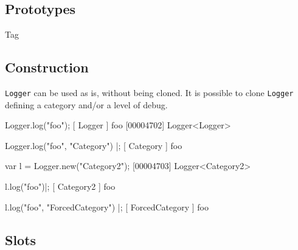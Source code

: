 \subsection{Prototypes}
\begin{refObjects}
\item[Tag]
\end{refObjects}

\subsection{Construction}

\lstinline|Logger| can be used as is, without being cloned. It is possible
to clone \lstinline|Logger| defining a category and/or a level of debug.

\begin{urbiscript}
Logger.log("foo");
[        Logger         ] foo
[00004702] Logger<Logger>

Logger.log("foo", "Category") |;
[       Category        ] foo

var l = Logger.new("Category2");
[00004703] Logger<Category2>

l.log("foo")|;
[       Category2       ] foo

l.log("foo", "ForcedCategory") |;
[    ForcedCategory     ] foo
\end{urbiscript}

\subsection{Slots}

